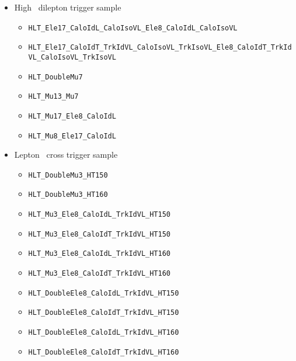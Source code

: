    \begin{itemize}
      \item High \pt\ dilepton trigger sample
      \begin{itemize}
         \item \verb=HLT_Ele17_CaloIdL_CaloIsoVL_Ele8_CaloIdL_CaloIsoVL=
         \item {\footnotesize \verb=HLT_Ele17_CaloIdT_TrkIdVL_CaloIsoVL_TrkIsoVL_Ele8_CaloIdT_TrkIdVL_CaloIsoVL_TrkIsoVL=}
         \item \verb=HLT_DoubleMu7=
         \item \verb=HLT_Mu13_Mu7=
         \item \verb=HLT_Mu17_Ele8_CaloIdL=
         \item \verb=HLT_Mu8_Ele17_CaloIdL=
      \end{itemize}
      \item Lepton \Ht\ cross trigger sample
      \begin{itemize}
        \item \verb=HLT_DoubleMu3_HT150=
        \item \verb=HLT_DoubleMu3_HT160=
        \item \verb=HLT_Mu3_Ele8_CaloIdL_TrkIdVL_HT150=
        \item \verb=HLT_Mu3_Ele8_CaloIdT_TrkIdVL_HT150=
        \item \verb=HLT_Mu3_Ele8_CaloIdL_TrkIdVL_HT160=
        \item \verb=HLT_Mu3_Ele8_CaloIdT_TrkIdVL_HT160=
        \item \verb=HLT_DoubleEle8_CaloIdL_TrkIdVL_HT150=
        \item \verb=HLT_DoubleEle8_CaloIdT_TrkIdVL_HT150=
        \item \verb=HLT_DoubleEle8_CaloIdL_TrkIdVL_HT160=
        \item \verb=HLT_DoubleEle8_CaloIdT_TrkIdVL_HT160=
      \end{itemize}
   \end{itemize}








